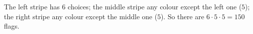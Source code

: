 The left stripe has $6$ choices; the middle stripe any colour except the left one ($5$); the right stripe any colour except the middle one ($5$). So there are $6\cdot5\cdot5=\boxed{150}$ flags.
